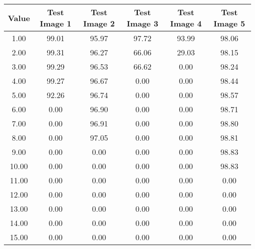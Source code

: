\begin{tabular}{|c|c|c|c|c|c|}
\hline
\textbf{Value}&\textbf{Test Image 1}&\textbf{Test Image 2}&\textbf{Test Image 3}&\textbf{Test Image 4}&\textbf{Test Image 5}\\\hline
1.00&99.01&95.97&97.72&93.99&98.06\\\hline
2.00&99.31&96.27&66.06&29.03&98.15\\\hline
3.00&99.29&96.53&66.62&0.00&98.24\\\hline
4.00&99.27&96.67&0.00&0.00&98.44\\\hline
5.00&92.26&96.74&0.00&0.00&98.57\\\hline
6.00&0.00&96.90&0.00&0.00&98.71\\\hline
7.00&0.00&96.91&0.00&0.00&98.80\\\hline
8.00&0.00&97.05&0.00&0.00&98.81\\\hline
9.00&0.00&0.00&0.00&0.00&98.83\\\hline
10.00&0.00&0.00&0.00&0.00&98.83\\\hline
11.00&0.00&0.00&0.00&0.00&0.00\\\hline
12.00&0.00&0.00&0.00&0.00&0.00\\\hline
13.00&0.00&0.00&0.00&0.00&0.00\\\hline
14.00&0.00&0.00&0.00&0.00&0.00\\\hline
15.00&0.00&0.00&0.00&0.00&0.00\\\hline
\end{tabular}
